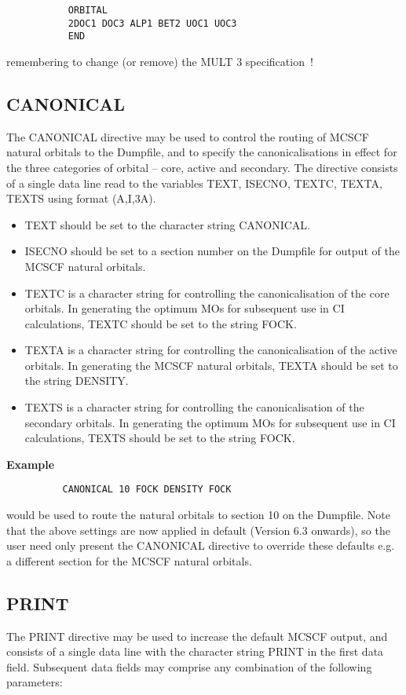\documentclass[11pt,fleqn]{article}
\begin{document}
{
\footnotesize
\begin{verbatim}
           ORBITAL
           2DOC1 DOC3 ALP1 BET2 UOC1 UOC3
           END
\end{verbatim}
}
remembering to change (or remove) the MULT 3 specification~!\\

\subsection[CANONICAL]{CANONICAL}
The CANONICAL directive may be used to control the routing
of MCSCF natural orbitals to the Dumpfile, and
to specify the canonicalisations in effect for the three
categories of orbital --  core, active and secondary. The directive
consists of a single data line read to the variables
TEXT, ISECNO, TEXTC, TEXTA, TEXTS using format (A,I,3A).
\begin{itemize}
\item TEXT should be set to the character string CANONICAL.
\item ISECNO should be set to a section number on the Dumpfile
for output of the MCSCF natural orbitals.
\item TEXTC is a character string for controlling
the canonicalisation of the core orbitals. In generating
the optimum MOs for subsequent use in CI calculations, 
TEXTC should be set to the string FOCK.
\item TEXTA is a character string for controlling
the canonicalisation of the active orbitals. In generating
the MCSCF natural orbitals,
TEXTA should be set to the string DENSITY.
\item TEXTS is a character string for controlling
the canonicalisation of the secondary orbitals. In generating
the optimum MOs for subsequent use in CI calculations, 
TEXTS should be set to the string FOCK.
\end{itemize}
{\bf Example}
{
\footnotesize
\begin{verbatim}
          CANONICAL 10 FOCK DENSITY FOCK
\end{verbatim}
}
would be used to route the natural orbitals to section 10 on the
Dumpfile. Note that the above settings are now applied in default
(Version 6.3 onwards), so the user need only present the CANONICAL
directive to override these defaults e.g. a different section for the
MCSCF natural orbitals.

\subsection[PRINT]{PRINT}
The PRINT directive may be used to increase
the default MCSCF output, and consists of a single data line with
the character string PRINT in the first data field. Subsequent
data fields may comprise any combination of the following parameters:
\end{document}
